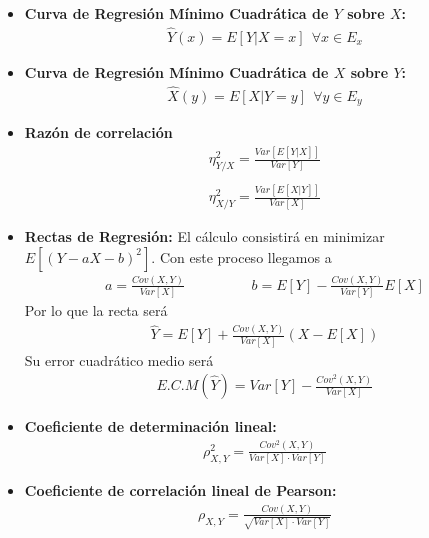 \documentclass[12pt]{article}
\begin{document}
\begin{itemize}
        \item \textbf{Curva de Regresión Mínimo Cuadrática de $Y$ sobre $X$:}
        \begin{gather*}
            \hat{Y}(x)=E[Y|X=x]\ \ \forall x \in E_x
        \end{gather*}

        \item \textbf{Curva de Regresión Mínimo Cuadrática de $X$ sobre $Y$:}
        \begin{gather*}
            \hat{X}(y)=E[X|Y=y]\ \ \forall y \in E_y
        \end{gather*}

        \item \textbf{Razón de correlación}
        \begin{gather*}
            \eta^2_{Y/X} = \frac{Var[E[Y|X]]}{Var[Y]}\\\\
            \eta^2_{X/Y} = \frac{Var[E[X|Y]]}{Var[X]}
        \end{gather*}

        \item \textbf{Rectas de Regresión:}
        El cálculo consistirá en minimizar $E[(Y-aX-b)^2]$. Con este proceso llegamos a 
        \begin{gather*}
            a=\frac{Cov(X,Y)}{Var[X]}\hspace{2cm} b=E[Y]-\frac{Cov(X,Y)}{Var[Y]}E[X]
        \end{gather*}
        Por lo que la recta será
        \begin{gather*}
            \hat{Y}=E[Y]+\frac{Cov(X,Y)}{Var[X]}(X-E[X])
        \end{gather*}
        Su error cuadrático medio será
        \begin{gather*}
            E.C.M(\hat{Y}) = Var[Y] - \frac{Cov^2(X,Y)}{Var[X]}
        \end{gather*}

        \item \textbf{Coeficiente de determinación lineal:}
        \begin{gather*}
            \rho^2_{X,Y} = \frac{Cov^2(X,Y)}{Var[X]\cdot Var[Y]}
        \end{gather*}

        \item \textbf{Coeficiente de correlación lineal de Pearson:}
        \begin{gather*}
            \rho_{X,Y} = \frac{Cov(X,Y)}{\sqrt{Var[X]\cdot Var[Y]}}
        \end{gather*}
    \end{itemize}

    
    
\end{document}
